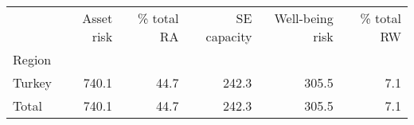 \begin{tabular}{lrrrrr}
\toprule
{} &  Asset risk &  \% total RA &  SE capacity &  Well-being risk &  \% total RW \\
Region &             &             &              &                  &             \\
\midrule
Turkey &       740.1 &        44.7 &        242.3 &            305.5 &         7.1 \\
Total  &       740.1 &        44.7 &        242.3 &            305.5 &         7.1 \\
\bottomrule
\end{tabular}
